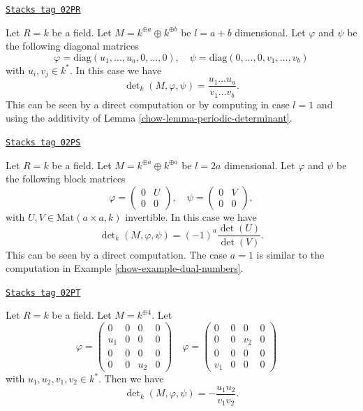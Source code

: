 \begin{example}
\label{chow-example-generic-vector-space}
\href{https://stacks.math.columbia.edu/tag/02PR}{\texttt{Stacks tag 02PR}}

Let $R = k$ be a field.
Let $M = k^{\oplus a} \oplus k^{\oplus b}$ be $l = a + b$ dimensional.
Let $\varphi$ and $\psi$ be the following diagonal matrices
$$
\varphi = \text{diag}(u_1, \ldots, u_a, 0, \ldots, 0),
\quad
\psi = \text{diag}(0, \ldots, 0, v_1, \ldots, v_b)
$$
with $u_i, v_j \in k^*$. In this case we have
$$
\det\nolimits_k(M, \varphi, \psi)
=
\frac{u_1 \ldots u_a}{v_1 \ldots v_b}.
$$
This can be seen by a direct computation or by computing in case $l = 1$
and using the additivity of Lemma \ref{chow-lemma-periodic-determinant}.
\end{example}

\begin{example}
\label{chow-example-special-vector-space}
\href{https://stacks.math.columbia.edu/tag/02PS}{\texttt{Stacks tag 02PS}}

Let $R = k$ be a field.
Let $M = k^{\oplus a} \oplus k^{\oplus a}$ be $l = 2a$ dimensional.
Let $\varphi$ and $\psi$ be the following block matrices
$$
\varphi =
\left(
\begin{matrix}
0 & U \\
0 & 0
\end{matrix}
\right),
\quad
\psi =
\left(
\begin{matrix}
0 & V \\
0 & 0
\end{matrix}
\right),
$$
with $U, V \in \text{Mat}(a \times a, k)$ invertible.
In this case we have
$$
\det\nolimits_k(M, \varphi, \psi)
=
(-1)^a\frac{\det(U)}{\det(V)}.
$$
This can be seen by a direct computation.
The case $a = 1$ is similar to the computation in
Example \ref{chow-example-dual-numbers}.
\end{example}

\begin{example}[A la oort]
\label{chow-example-a-la-oort}
\href{https://stacks.math.columbia.edu/tag/02PT}{\texttt{Stacks tag 02PT}}

Let $R = k$ be a field.
Let $M = k^{\oplus 4}$.
Let
$$
\varphi =
\left(
\begin{matrix}
  0 &   0 &   0 &   0 \\
u_1 &   0 &   0 &   0 \\
  0 &   0 &   0 &   0 \\
  0 &   0 & u_2 &   0
\end{matrix}
\right)
\quad
\varphi =
\left(
\begin{matrix}
  0 &   0 &   0 &   0 \\
  0 &   0 & v_2 &   0 \\
  0 &   0 &   0 &   0 \\
v_1 &   0 &   0 &   0
\end{matrix}
\right)
\quad
$$
with $u_1, u_2, v_1, v_2 \in k^*$.
Then we have
$$
\det\nolimits_k(M, \varphi, \psi) = -\frac{u_1u_2}{v_1v_2}.
$$
\end{example}

